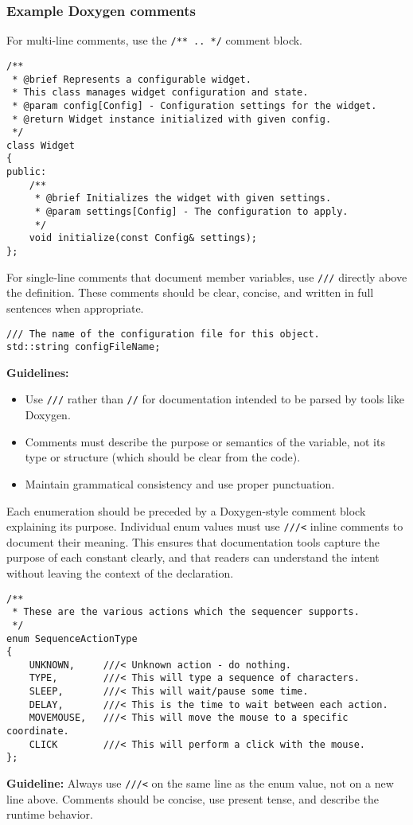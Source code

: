 \subsubsection*{Example Doxygen comments}

For multi-line comments, use the \texttt{/** .. */} comment block.
\begin{lstlisting}[style=cppstyle]
/**
 * @brief Represents a configurable widget.
 * This class manages widget configuration and state.
 * @param config[Config] - Configuration settings for the widget.
 * @return Widget instance initialized with given config.
 */
class Widget 
{
public:
    /**
     * @brief Initializes the widget with given settings.
     * @param settings[Config] - The configuration to apply.
     */
    void initialize(const Config& settings);
};
\end{lstlisting}
For single-line comments that document member variables, use \texttt{///} directly above the definition. These comments should be clear, concise, and written in full sentences when appropriate.
\begin{lstlisting}[style=cppstyle]
/// The name of the configuration file for this object.
std::string configFileName;
\end{lstlisting}
\textbf{Guidelines:}
\begin{itemize}
    \item Use \texttt{///} rather than \texttt{//} for documentation intended to be parsed by tools like Doxygen.
    \item Comments must describe the purpose or semantics of the variable, not its type or structure (which should be clear from the code).
    \item Maintain grammatical consistency and use proper punctuation.
\end{itemize}
Each enumeration should be preceded by a Doxygen-style comment block explaining its purpose. Individual enum values must use \texttt{///<} inline comments to document their meaning. This ensures that documentation tools capture the purpose of each constant clearly, and that readers can understand the intent without leaving the context of the declaration.
\begin{lstlisting}[style=cppstyle]
/**
 * These are the various actions which the sequencer supports.
 */
enum SequenceActionType
{
    UNKNOWN,     ///< Unknown action - do nothing.
    TYPE,        ///< This will type a sequence of characters.
    SLEEP,       ///< This will wait/pause some time.
    DELAY,       ///< This is the time to wait between each action.
    MOVEMOUSE,   ///< This will move the mouse to a specific coordinate.
    CLICK        ///< This will perform a click with the mouse.
};
\end{lstlisting}
\textbf{Guideline:} Always use \texttt{///<} on the same line as the enum value, not on a new line above. Comments should be concise, use present tense, and describe the runtime behavior.


